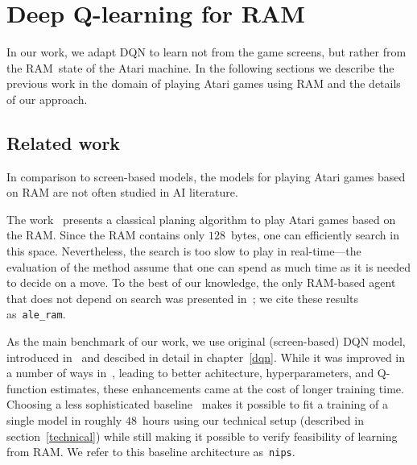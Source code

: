 \chapter{Deep Q-learning for RAM}\label{dqn-ram}
In our work, we adapt DQN to learn not from the game screens, but rather from the RAM~state of the Atari machine. In the following sections we describe the previous work in the domain of playing Atari games using RAM and the details of our approach.

\section{Related work}
In comparison to screen-based models, the models for playing Atari games based on RAM are not often studied in AI literature.

The work~\cite{nir} presents a classical planing algorithm to play Atari games based on the RAM. Since the RAM contains only $128$~bytes, one can efficiently search in this space. Nevertheless, the search is too slow to play in real-time---the evaluation of the method assume that one can spend as much time as it is needed to decide on a move. To the best of our knowledge, the only RAM-based agent that does not depend on search was presented in~\cite{ale}; we cite these results as~\texttt{ale\_ram}.

As the main benchmark of our work, we use original (screen-based) DQN model, introduced in~\cite{nips-dqn} and descibed in detail in chapter~\ref{dqn}. While it was improved in a number of ways in~\cite{nature-dqn, double-dqn, shallow-dqn, duelling-dqn}, leading to better achitecture, hyperparameters, and Q-function estimates, these enhancements came at the cost of longer training time. Choosing a less sophisticated baseline~\cite{nips-dqn} makes it possible to fit a training of a single model in roughly $48$~hours using our technical setup (described in section~\ref{technical}) while still making it possible to verify feasibility of learning from RAM. We refer to this baseline architecture as~\texttt{nips}.

